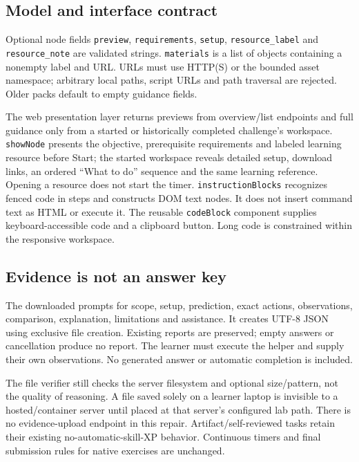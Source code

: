 \subsection{Model and interface contract}
Optional node fields \texttt{preview}, \texttt{requirements}, \texttt{setup}, \texttt{resource\_label} and
\texttt{resource\_note} are validated strings. \texttt{materials} is a list of
objects containing a nonempty label and URL. URLs must use HTTP(S) or the bounded
 asset namespace; arbitrary local paths, script URLs and path
traversal are rejected. Older packs default to empty guidance fields.

The web presentation layer returns previews from overview/list endpoints and full
guidance only from a started or historically completed challenge's workspace.
\texttt{showNode} presents the objective, prerequisite requirements and labeled
learning resource before
Start; the started workspace reveals detailed setup, download links, an ordered
``What to do'' sequence and the same learning reference. Opening a resource does
not start the timer.
\texttt{instructionBlocks} recognizes fenced code in steps and constructs DOM
text nodes. It does not insert command text as HTML or execute it. The reusable
\texttt{codeBlock} component supplies keyboard-accessible code and a clipboard
button. Long code is constrained within the responsive workspace.

\subsection{Evidence is not an answer key}
The downloaded  prompts for scope, setup, prediction, exact
actions, observations, comparison, explanation, limitations and assistance. It
creates UTF-8 JSON using exclusive file creation. Existing reports are preserved;
empty answers or cancellation produce no report. The learner must execute the
helper and supply their own observations. No generated answer or automatic
completion is included.

The file verifier still checks the server filesystem and optional size/pattern,
not the quality of reasoning. A file saved solely on a learner laptop is invisible
to a hosted/container server until placed at that server's configured lab path.
There is no evidence-upload endpoint in this repair. Artifact/self-reviewed tasks
retain their existing no-automatic-skill-XP behavior. Continuous timers and final
submission rules for native exercises are unchanged.

